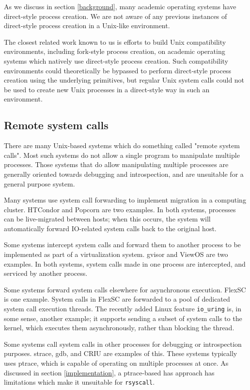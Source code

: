 \documentclass[letterpaper,twocolumn,10pt]{article}
\begin{document}
As we discuss in section \ref{background},
many academic operating systems have direct-style process creation.
We are not aware of any previous instances of direct-style process creation in a Unix-like environment.

The closest related work known to us
is efforts to build Unix compatibility environments, including fork-style process creation,
on academic operating systems which natively use direct-style process creation.\cite{exokernel}
Such compatibility environments could theoretically be bypassed to perform direct-style process creation
using the underlying primitives,
but regular Unix system calls could not be used to create new Unix processes in a direct-style way
in such an environment.
\subsection{Remote system calls}
There are many Unix-based systems which do something called "remote system calls".
Most such systems do not allow a single program to manipulate multiple processes.
Those systems that do allow manipulating multiple processes
are generally oriented towards debugging and introspection,
and are unsuitable for a general purpose system.

Many systems use system call forwarding to implement migration in a computing cluster.
HTCondor\cite{condor} and Popcorn\cite{popcorn} are two examples.
In both systems, processes can be live-migrated between hosts;
when this occurs, the system will automatically forward IO-related system calls
back to the original host.

Some systems intercept system calls and forward them to another process to be implemented
as part of a virtualization system.
gvisor\cite{gvisor} and ViewOS\cite{viewos} are two examples.
In both systems,
system calls made in one process are intercepted,
and serviced by another process.

Some systems forward system calls elsewhere for asynchronous execution.
FlexSC\cite{flexsc} is one example.
System calls in FlexSC are forwarded to a pool of dedicated system call execution threads.
The recently added Linux feature \verb|io_uring| is, in some sense, another example;
it supports sending a subset of system calls to the kernel,
which executes them asynchronously,
rather than blocking the thread.

Some systems call system calls in other processes for debugging or introspection purposes.
strace, gdb, and CRIU\cite{criu} are examples of this.
These systems typically uses ptrace,
which is capable of operating on multiple processes at once.
As discussed in section \ref{implementation},
a ptrace-based has approach has limitations which make it unsuitable for \texttt{rsyscall}.
\end{document}
